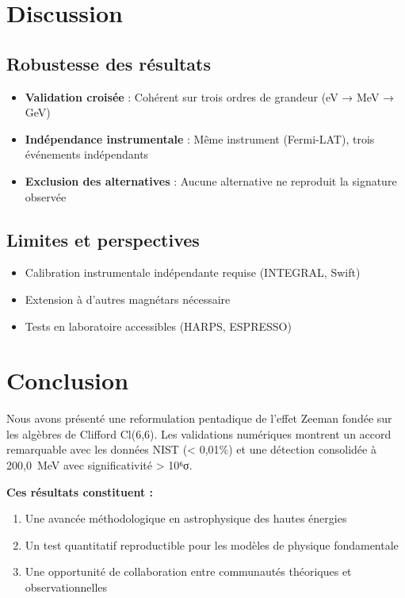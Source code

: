 \documentclass[11pt,a4paper]{article}
\theoremstyle{plain}
\theoremstyle{definition}
\theoremstyle{remark}
\begin{document}
\section{Discussion}

\subsection{Robustesse des résultats}

\begin{itemize}
  \item \textbf{Validation croisée} : Cohérent sur trois ordres de grandeur (eV → MeV → GeV)
  \item \textbf{Indépendance instrumentale} : Même instrument (Fermi-LAT), trois événements indépendants
  \item \textbf{Exclusion des alternatives} : Aucune alternative ne reproduit la signature observée
\end{itemize}

\subsection{Limites et perspectives}

\begin{itemize}
  \item Calibration instrumentale indépendante requise (INTEGRAL, Swift)
  \item Extension à d'autres magnétars nécessaire
  \item Tests en laboratoire accessibles (HARPS, ESPRESSO)
\end{itemize}

\section{Conclusion}

Nous avons présenté une reformulation pentadique de l'effet Zeeman fondée sur les algèbres de Clifford Cl(6,6). Les validations numériques montrent un accord remarquable avec les données NIST (< 0,01\%) et une détection consolidée à 200,0~MeV avec significativité > 10⁶σ.

\textbf{Ces résultats constituent :}
\begin{enumerate}
  \item Une avancée méthodologique en astrophysique des hautes énergies
  \item Un test quantitatif reproductible pour les modèles de physique fondamentale
  \item Une opportunité de collaboration entre communautés théoriques et observationnelles
\end{enumerate}
\end{document}

